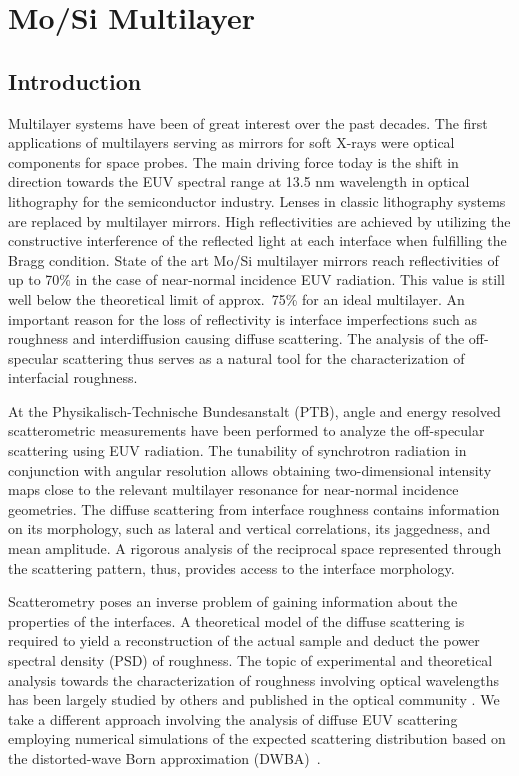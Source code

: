 \chapter{Mo/Si Multilayer}

\section{Introduction} Multilayer systems have been of great interest over the past decades. The first applications of multilayers serving as mirrors for soft X-rays were optical components for space probes. The main driving force today is the shift in direction towards the EUV spectral range at 13.5 nm wavelength in optical lithography for the semiconductor industry. Lenses in classic lithography systems are replaced by multilayer mirrors. High  reflectivities are achieved by utilizing the constructive interference of the reflected light at each interface when fulfilling the Bragg condition. State of the art Mo/Si multilayer mirrors reach reflectivities of up to 70\% \cite{braun2002mo, Feigl2006703} in the case of near-normal incidence EUV radiation. This value is still well below the theoretical limit of approx.~75\% for an ideal multilayer. An important reason for the loss of reflectivity is interface imperfections such as roughness and interdiffusion causing diffuse scattering. The analysis of the off-
specular scattering 
thus serves as a 
natural tool for the characterization of interfacial roughness. 

At the Physikalisch-Technische Bundesanstalt (PTB), angle and energy resolved scatterometric measurements have been performed to analyze the off-specular scattering using EUV radiation. The tunability of synchrotron radiation in conjunction with angular resolution allows obtaining two-dimensional intensity maps close to the relevant multilayer resonance for near-normal incidence geometries. The diffuse scattering from interface roughness contains information on its morphology, such as lateral and vertical correlations, its jaggedness, and mean amplitude. A rigorous analysis of the reciprocal space represented through the scattering pattern, thus, provides access to the interface morphology.

Scatterometry poses an inverse problem of gaining information about the properties of the interfaces. A theoretical model of the diffuse scattering is required to yield a reconstruction of the actual sample and deduct the power spectral density (PSD) of roughness. The topic of experimental and theoretical analysis towards the characterization of roughness involving optical wavelengths has been largely studied by others and published in the optical community \cite{Amra:93_2,Amra:94, Elson:80, Elson:83, Schroder:11, Schroder:14}. We take a different approach involving the analysis of diffuse EUV scattering employing numerical simulations of the expected scattering distribution based on the distorted-wave Born approximation (DWBA)~\cite{PhysRevB.49.10668,PhysRevB.47.15896}.

